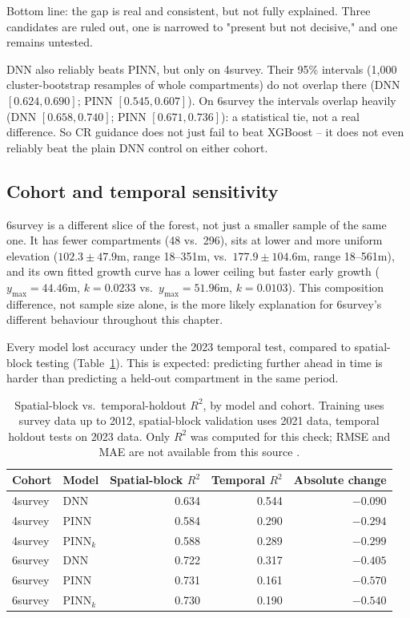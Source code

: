 Bottom line: the gap is real and consistent, but not fully explained. Three candidates are ruled
out, one is narrowed to "present but not decisive," and one remains untested.

DNN also reliably beats PINN, but only on 4survey. Their 95\% intervals (1{,}000 cluster-bootstrap
resamples of whole compartments) do not overlap there (DNN $[0.624,0.690]$; PINN $[0.545,0.607]$).
On 6survey the intervals overlap heavily (DNN $[0.658,0.740]$; PINN $[0.671,0.736]$): a
statistical tie, not a real difference. So CR guidance does not just fail to beat XGBoost -- it
does not even reliably beat the plain DNN control on either cohort.


\subsection{Cohort and temporal sensitivity}

6survey is a different slice of the forest, not just a smaller sample of the same one. It has
fewer compartments (48 vs.\ 296), sits at lower and more uniform elevation ($102.3\pm47.9$m,
range 18--351m, vs.\ $177.9\pm104.6$m, range 18--561m), and its own fitted growth curve has a
lower ceiling but faster early growth ($y_{\max}=44.46$m, $k=0.0233$ vs.\ $y_{\max}=51.96$m,
$k=0.0103$). This composition difference, not sample size alone, is the more likely explanation
for 6survey's different behaviour throughout this chapter.

Every model lost accuracy under the 2023 temporal test, compared to spatial-block testing
(Table~\ref{tab:results-rq1-temporal}). This is expected: predicting further ahead in time is
harder than predicting a held-out compartment in the same period.

\begin{table}[!htbp]
\centering
\small
\renewcommand{\arraystretch}{1.2}
\setlength{\tabcolsep}{4pt}
\begin{tabular}{llrrr}
\toprule
Cohort & Model & Spatial-block $R^2$ & Temporal $R^2$ & Absolute change \\
\midrule
4survey & DNN & 0.634 & 0.544 & $-0.090$ \\
4survey & PINN & 0.584 & 0.290 & $-0.294$ \\
4survey & PINN$_k$ & 0.588 & 0.289 & $-0.299$ \\
6survey & DNN & 0.722 & 0.317 & $-0.405$ \\
6survey & PINN & 0.731 & 0.161 & $-0.570$ \\
6survey & PINN$_k$ & 0.730 & 0.190 & $-0.540$ \\
\bottomrule
\end{tabular}
\caption{Spatial-block vs.\ temporal-holdout $R^2$, by model and cohort. Training uses survey data
up to 2012, spatial-block validation uses 2021 data, temporal holdout tests on 2023 data. Only
$R^2$ was computed for this check; RMSE and MAE are not available from this source
.}
\label{tab:results-rq1-temporal}
\end{table}

